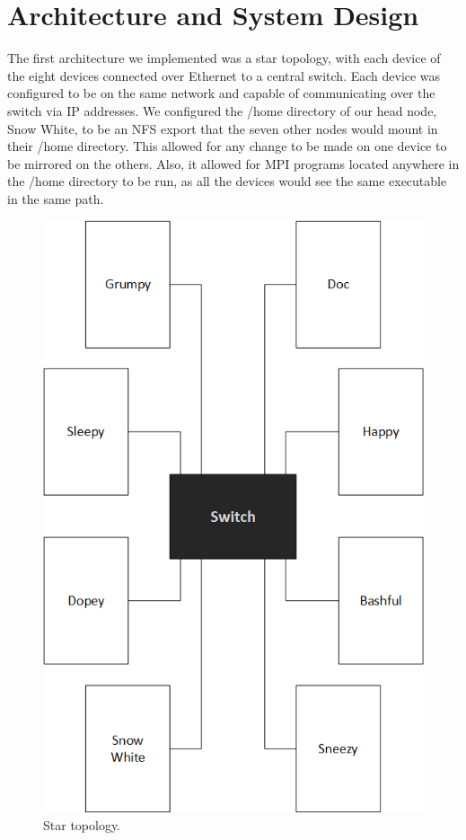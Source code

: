  \section{Architecture and System Design}
The first architecture we implemented was a star topology, with each device of the eight devices connected over Ethernet to a central switch. Each device was configured to be on the same network and capable of communicating over the switch via IP addresses. We configured the /home directory of our head node, Snow White, to be an NFS export that the seven other nodes would mount in their /home directory. This allowed for any change to be made on one device to be mirrored on the others. Also, it allowed for MPI programs located anywhere in the /home directory to be run, as all the devices would see the same executable in the same path.

\begin{figure}[h]
	\caption{Star topology.}
	\centering
		\includegraphics[scale=0.5]{cluster_star.png}
\end{figure}

